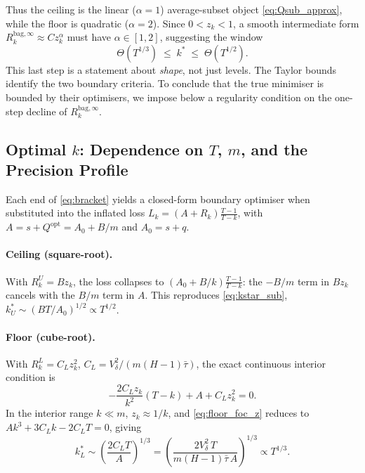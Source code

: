 \documentclass[12pt,a4paper]{article}
\theoremstyle{definition}
\newcommand{\Qopt}{Q^{\mathrm{opt}}}
\newcommand{\Rk}{R_k^{\mathrm{bag},\infty}}
\begin{document}
Thus the ceiling is the linear ($\alpha=1$) average-subset object
\eqref{eq:Qsub_approx}, while the floor is quadratic ($\alpha=2$).  Since
$0<z_k<1$, a smooth intermediate form $\Rk\approx Cz_k^\alpha$ must have
$\alpha\in[1,2]$, suggesting the window
\begin{equation}\label{eq:window}
  \Theta\!\left(T^{1/3}\right)\;\le\;k^*\;\le\;\Theta\!\left(T^{1/2}\right).
\end{equation}
This last step is a statement about \emph{shape}, not just levels.  The
Taylor bounds identify the two boundary criteria.  To conclude that the
true minimiser is bounded by their optimisers, we impose below a regularity
condition on the one-step decline of $\Rk$.

\subsection{Optimal $k$: Dependence on $T$, $m$, and the Precision Profile}
\label{sec:kdep}

Each end of \eqref{eq:bracket} yields a closed-form boundary optimiser when
substituted into the inflated loss $L_k=(A+R_k)\frac{T-1}{T-k}$, with
$A=s+\Qopt=A_0+B/m$ and $A_0=s+q$.

\paragraph{Ceiling (square-root).} With $R_k^U=Bz_k$, the loss collapses to
$(A_0+B/k)\frac{T-1}{T-k}$: the $-B/m$ term in $Bz_k$ cancels with the
$B/m$ term in $A$.  This reproduces
\eqref{eq:kstar_sub}, $k^*_U\sim(BT/A_0)^{1/2}\propto T^{1/2}$.

\paragraph{Floor (cube-root).} With $R_k^L=C_Lz_k^2$,
$C_L=V_\delta^2/(m(H-1)\bar\tau)$, the exact continuous interior condition is
\begin{equation}\label{eq:floor_foc_z}
  -\frac{2C_Lz_k}{k^2}(T-k)+A+C_Lz_k^2=0.
\end{equation}
In the interior range $k\ll m$, $z_k\approx1/k$, and
\eqref{eq:floor_foc_z} reduces to $Ak^3+3C_Lk-2C_LT=0$, giving
\begin{equation}\label{eq:kstar_floor}
  k^*_L\sim\left(\frac{2C_LT}{A}\right)^{1/3}
  =\left(\frac{2V_\delta^2\,T}{m(H-1)\bar\tau\,A}\right)^{1/3}\propto T^{1/3}.
\end{equation}
\end{document}
